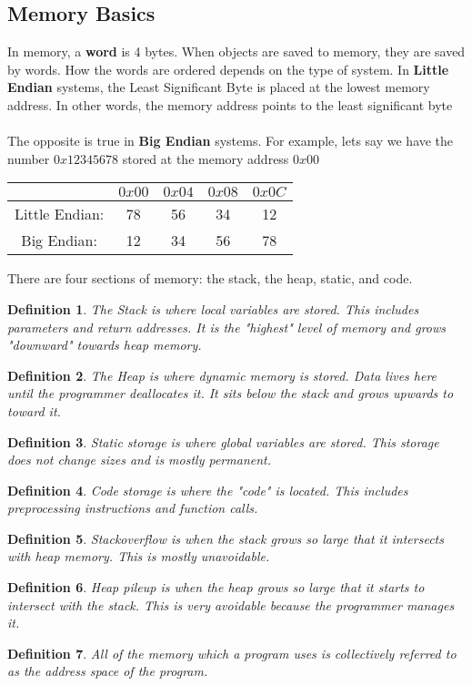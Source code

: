 \documentclass{article}
\newtheorem{definition}{Definition}
\begin{document}
\subsection{Memory Basics}
In memory, a \textbf{word} is 4 bytes. When objects are saved to memory, they are saved by words. How the words are ordered depends on the type of system.
In \textbf{Little Endian} systems, the Least Significant Byte is placed at the lowest memory address. In other words, the memory address points to the least significant byte\\\\
The opposite is true in \textbf{Big Endian} systems.
For example, lets say we have the number $0x12345678$ stored at the memory address $0x00$
\begin{center}
    \begin{tabular}{c|c|c|c|c}
        & $0x00$ & $0x04$ & $0x08$ & $0x0C$\\
        \hline
        Little Endian: & 78 & 56 & 34 & 12\\
        \hline
        Big Endian: & 12 & 34 & 56 & 78
    \end{tabular}
\end{center}
There are four sections of memory: the stack, the heap, static, and code. 
\begin{definition}
    The Stack is where local variables are stored. This includes parameters and return addresses. It is the "highest" level of memory and grows "downward" towards heap memory.
\end{definition}
\begin{definition}
    The Heap is where dynamic memory is stored. Data lives here until the programmer deallocates it. It sits below the stack and grows upwards to toward it.
\end{definition}
\begin{definition}
    Static storage is where global variables are stored. This storage does not change sizes and is mostly permanent.
\end{definition}
\begin{definition}
    Code storage is where the "code" is located. This includes preprocessing instructions and function calls.
\end{definition}
\begin{definition}
    Stackoverflow is when the stack grows so large that it intersects with heap memory. This is mostly unavoidable.
\end{definition}
\begin{definition}
    Heap pileup is when the heap grows so large that it starts to intersect with the stack. This is very avoidable because the programmer manages it.
\end{definition}
\begin{definition}
    All of the memory which a program uses is collectively referred to as the address space of the program.
\end{definition}
\end{document}
